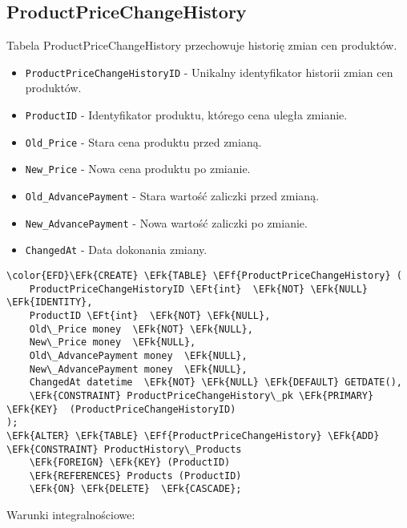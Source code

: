 \documentclass[11pt]{article}
\newcommand{\EFk}[1]{\textcolor{EFk}{\textbf{#1}}} %
\newcommand{\EFf}[1]{\textcolor{EFf}{#1}} %
\newcommand{\EFt}[1]{\textcolor{EFt}{\textbf{#1}}} %
\begin{document}
\subsection{ProductPriceChangeHistory}
\label{sec:org0410663}
Tabela ProductPriceChangeHistory przechowuje historię zmian cen produktów.
\begin{itemize}
\item \texttt{ProductPriceChangeHistoryID} - Unikalny identyfikator historii zmian cen produktów.
\item \texttt{ProductID} - Identyfikator produktu, którego cena uległa zmianie.
\item \texttt{Old\_Price} - Stara cena produktu przed zmianą.
\item \texttt{New\_Price} - Nowa cena produktu po zmianie.
\item \texttt{Old\_AdvancePayment} - Stara wartość zaliczki przed zmianą.
\item \texttt{New\_AdvancePayment} - Nowa wartość zaliczki po zmianie.
\item \texttt{ChangedAt} - Data dokonania zmiany.
\end{itemize}
\begin{Code}
\begin{Verbatim}
\color{EFD}\EFk{CREATE} \EFk{TABLE} \EFf{ProductPriceChangeHistory} (
    ProductPriceChangeHistoryID \EFt{int}  \EFk{NOT} \EFk{NULL} \EFk{IDENTITY},
    ProductID \EFt{int}  \EFk{NOT} \EFk{NULL},
    Old\_Price money  \EFk{NOT} \EFk{NULL},
    New\_Price money  \EFk{NULL},
    Old\_AdvancePayment money  \EFk{NULL},
    New\_AdvancePayment money  \EFk{NULL},
    ChangedAt datetime  \EFk{NOT} \EFk{NULL} \EFk{DEFAULT} GETDATE(),
    \EFk{CONSTRAINT} ProductPriceChangeHistory\_pk \EFk{PRIMARY} \EFk{KEY}  (ProductPriceChangeHistoryID)
);
\EFk{ALTER} \EFk{TABLE} \EFf{ProductPriceChangeHistory} \EFk{ADD} \EFk{CONSTRAINT} ProductHistory\_Products
    \EFk{FOREIGN} \EFk{KEY} (ProductID)
    \EFk{REFERENCES} Products (ProductID)
    \EFk{ON} \EFk{DELETE}  \EFk{CASCADE};
\end{Verbatim}
\end{Code}
Warunki integralnościowe:
\end{document}
